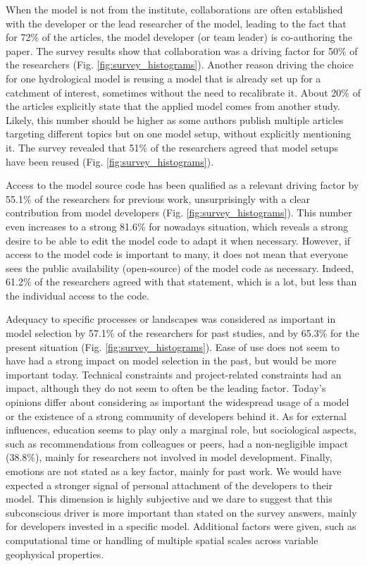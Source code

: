 \documentclass[10pt,a4paper]{article}
\begin{document}
When the model is not from the institute, collaborations are often established with the developer or the lead researcher of the model, leading to the fact that for 72\% of the articles, the model developer (or team leader) is co-authoring the paper. The survey results show that collaboration was a driving factor for 50\% of the researchers (Fig. \ref{fig:survey_histograms}). Another reason driving the choice for one hydrological model is reusing a model that is already set up for a catchment of interest, sometimes without the need to recalibrate it. About 20\% of the articles explicitly state that the applied model comes from another study. Likely, this number should be higher as some authors publish multiple articles targeting different topics but on one model setup, without explicitly mentioning it. The survey revealed that 51\% of the researchers agreed that model setups have been reused (Fig. \ref{fig:survey_histograms}).

Access to the model source code has been qualified as a relevant driving factor by 55.1\% of the researchers for previous work, unsurprisingly with a clear contribution from model developers (Fig. \ref{fig:survey_histograms}). This number even increases to a strong 81.6\% for nowadays situation, which reveals a strong desire to be able to edit the model code to adapt it when necessary. However, if access to the model code is important to many, it does not mean that everyone sees the public availability (open-source) of the model code as necessary. Indeed, 61.2\% of the researchers agreed with that statement, which is a lot, but less than the individual access to the code.

Adequacy to specific processes or landscapes was considered as important in model selection by 57.1\% of the researchers for past studies, and by 65.3\% for the present situation (Fig. \ref{fig:survey_histograms}). Ease of use does not seem to have had a strong impact on model selection in the past, but would be more important today. Technical constraints and project-related constraints had an impact, although they do not seem to often be the leading factor. Today's opinions differ about considering as important the widespread usage of a model or the existence of a strong community of developers behind it. As for external influences, education seems to play only a marginal role, but sociological aspects, such as recommendations from colleagues or peers, had a non-negligible impact (38.8\%), mainly for researchers not involved in model development. Finally, emotions are not stated as a key factor, mainly for past work. We would have expected a stronger signal of personal attachment of the developers to their model. This dimension is highly subjective and we dare to suggest that this subconscious driver is more important than stated on the survey answers, mainly for developers invested in a specific model. Additional factors were given, such as computational time or handling of multiple spatial scales across variable geophysical properties.
\end{document}
